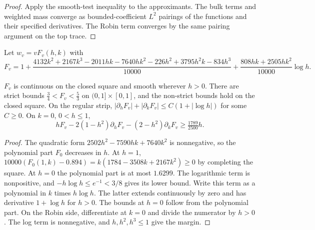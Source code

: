 \begin{proof}
\leanok
Apply the smooth-test inequality to the approximants. The bulk terms
and weighted mass converge as bounded-coefficient $L^2$ pairings of
the functions and their specified derivatives. The Robin term converges
by the same pairing argument on the top trace.
\end{proof}

\begin{definition}
\label{def:odd-b-comparison}
\leanok
Let $w_v=vF_v(h,k)$ with
\[
  F_v=1+\frac{4132k^2+2167k^3-2011hk-7640hk^2-226h^2+3795h^2k-834h^3}{10000}
  +\frac{808hk+2505hk^2}{10000}\log h .
\]
\end{definition}

\begin{lemma}
\label{lem:mixed-v-multiplier-bounds}
\leanok
$F_v$ is continuous on the closed square and smooth wherever $h>0$.
There are strict bounds $\tfrac34<F_v<\tfrac53$ on $(0,1]\times[0,1]$,
and the non-strict bounds hold on the closed square. On the regular strip,
$|\partial_hF_v|+|\partial_kF_v|\le C(1+|\log h|)$ for some $C\ge0$.
On $k=0$, $0<h\le1$,
\[
  hF_v-2(1-h^2)\partial_hF_v-(2-h^2)\partial_kF_v\ge\tfrac{1789}{2500}h .
\]
\end{lemma}

\begin{proof}
\leanok
The quadratic form $2502h^2-7590hk+7640k^2$ is nonnegative, so the
polynomial part $F_0$ decreases in $h$. At $h=1$,
$10000(F_0(1,k)-0.894)=k(1784-3508k+2167k^2)\ge0$ by completing the
square. At $h=0$ the polynomial part is at most $1.6299$. The logarithmic
term is nonpositive, and $-h\log h\le e^{-1}<3/8$ gives its lower bound.
Write this term as a polynomial in $k$ times $h\log h$. The latter
extends continuously by zero and has derivative $1+\log h$ for $h>0$.
The bounds at $h=0$ follow from the polynomial part.
On the Robin side, differentiate at $k=0$ and divide the numerator by
$h>0$. The log term is nonnegative, and $h,h^2,h^3\le1$ give the margin.
\end{proof}


